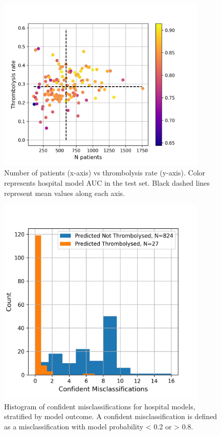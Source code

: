 \documentclass[12pt,a4paper, pdftex]{elsarticle}
\begin{document}
\begin{figure}[h]
\centering
\includegraphics[width=10cm]{figures/test_performance.jpg}
\caption{Number of patients (x-axis) vs thrombolysis rate (y-axis). Color represents hospital model AUC in the test set. Black dashed lines represent mean values along each axis.}
\label{fig:test_performance}
\end{figure}


\begin{figure}[h]
\centering
\includegraphics[width=10cm]{figures/missclassified_histogram.jpg}
\caption{Histogram of confident misclassifications for hospital models, stratified by model outcome. A confident misclassification is defined as a misclassification with model probability < 0.2 or > 0.8.}
\label{fig:missed}
\end{figure}
\end{document}
